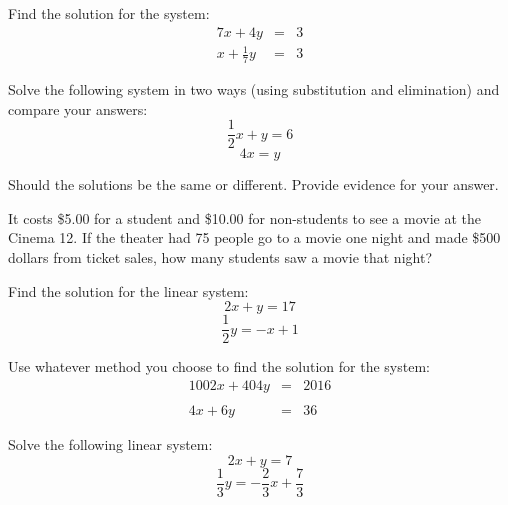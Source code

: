 \bigskip

\begin{exercise}
Find the solution for the system:
$$
\begin{array}{rcl}
7x + 4y & = & 3 \\
x + \frac{1}{7}y & = & 3	
\end{array}
$$
\end{exercise}
\bigskip

\begin{exercise}
Solve the following system in two ways (using substitution and elimination) and compare your answers:
$$
\frac{1}{2}x + y = 6
$$	
$$
4x =y
$$

Should the solutions be the same or different. Provide evidence for your answer.
\end{exercise}

\bigskip

\begin{exercise}
It costs \$5.00 for a student and \$10.00 for non-students to see a movie at the Cinema 12. If the theater had 75 people go to a movie one night and made \$500 dollars from ticket sales, how many students saw a movie that night?
\end{exercise}

\bigskip

\begin{exercise}
	Find the solution for the linear system:
	$$
	2x+y=17
	$$
	$$
	\frac{1}{2}y=-x +1
	$$	
\end{exercise}

\begin{exercise}
Use whatever method you choose to find the solution for the system:
$$
\begin{array}{rcl}	
1002x + 404y &=  & 2016 \\ \\
4x + 6y &= &36
\end{array}
$$ 
\end{exercise}

\begin{exercise}
Solve the following linear system:
$$
2x+ y = 7 
$$
$$
\frac{1}{3}y = -\frac{2}{3}x + \frac{7}{3}
$$	
\end{exercise}
